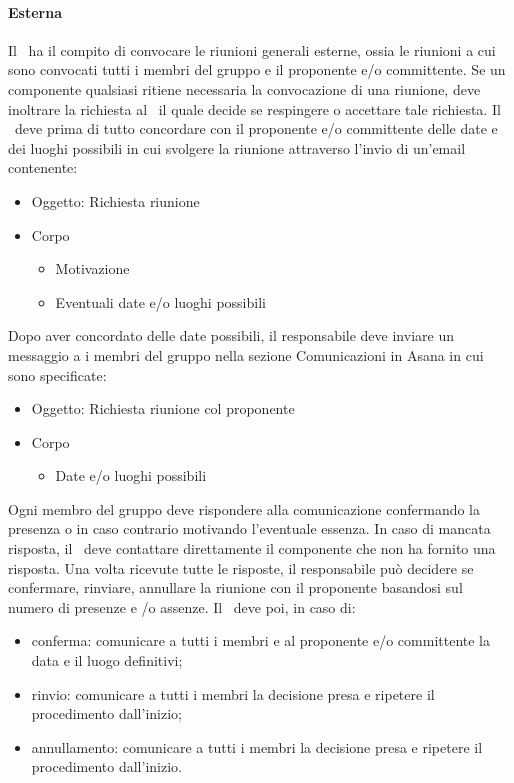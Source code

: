 \documentclass[../NormeDiProgetto.tex]{subfiles}
\begin{document}
						\paragraph{Esterna\\}
						Il \responsabilediprogetto\ ha il compito di convocare le riunioni generali esterne, ossia
						le riunioni a cui sono convocati tutti i membri del gruppo e il proponente e/o committente.
						Se un componente qualsiasi ritiene necessaria la convocazione di una riunione, deve
						inoltrare la richiesta al \responsabilediprogetto\ il quale decide se respingere o accettare
						tale richiesta.
						Il \responsabilediprogetto\ deve prima di tutto concordare con il proponente e/o committente delle date e dei luoghi
						possibili in cui svolgere la riunione attraverso l'invio di un'email contenente:
						\begin{itemize}
							\item Oggetto: Richiesta riunione
							\item Corpo
							\begin{itemize}
								\item Motivazione
								\item Eventuali date e/o luoghi possibili
							\end{itemize}
						\end{itemize}
						Dopo aver concordato delle date possibili, il responsabile deve inviare un messaggio a
						i membri del gruppo nella sezione Comunicazioni in Asana in cui sono specificate:
						\begin{itemize}
							\item Oggetto: Richiesta riunione col proponente
							\item Corpo
							\begin{itemize}
								\item Date e/o luoghi possibili
							\end{itemize}
						\end{itemize}
						Ogni membro del gruppo deve rispondere alla comunicazione confermando la presenza o in caso contrario motivando l'eventuale essenza. In caso di mancata risposta, il \responsabilediprogetto\ deve contattare direttamente il componente che non ha fornito una risposta. Una volta ricevute tutte le risposte, il responsabile può decidere se confermare, rinviare, annullare la riunione con il proponente basandosi sul numero di presenze e /o assenze.
						Il \responsabilediprogetto\ deve poi, in caso di:
						\begin{itemize}
							\item conferma: comunicare a tutti i membri e al proponente e/o committente la data e il luogo definitivi;
							\item rinvio: comunicare a tutti i membri la decisione presa e ripetere il procedimento dall'inizio;
							\item annullamento: comunicare a tutti i membri la decisione presa e ripetere il procedimento dall'inizio.
						\end{itemize}
\end{document}

